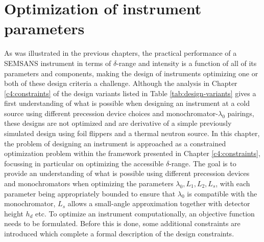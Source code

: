 \documentclass{article}
\begin{document}
\section{Optimization of instrument parameters}
\label{c5:optimization}
As was illustrated in the previous chapters, the practical performance of a SEMSANS instrument in terms of $\delta$-range and intensity is a function of all of its parameters and components, making the design of instruments optimizing one or both of these design criteria a challenge. Although the analysis in Chapter \ref{c4:constraints} of the design variants listed in Table \ref{tab:design-variants} gives a first understanding of what is possible when designing an instrument at a cold source using different precession device choices and monochromator-$\lambda_0$ pairings, these designs are not optimized and are derivative of a simple previously simulated design \cite{bouwman2021b} using foil flippers and a thermal neutron source. In this chapter, the problem of designing an instrument is approached as a constrained optimization problem within the framework presented in Chapter \ref{c4:constraints}, focussing in particular on optimizing the accessible $\delta$-range. The goal is to provide an understanding of what is possible using different precession devices and monochromators when optimizing the parameters $\lambda_0, L_1, L_2, L_s$, with each parameter being appropriately bounded to ensure that $\lambda_0$ is compatible with the monochromator, $L_s$ allows a small-angle approximation together with detector height $h_d$ etc. 
To optimize an instrument computationally, an objective function needs to be formulated. Before this is done, some additional constraints are introduced which complete a formal description of the design constraints.
\end{document}
